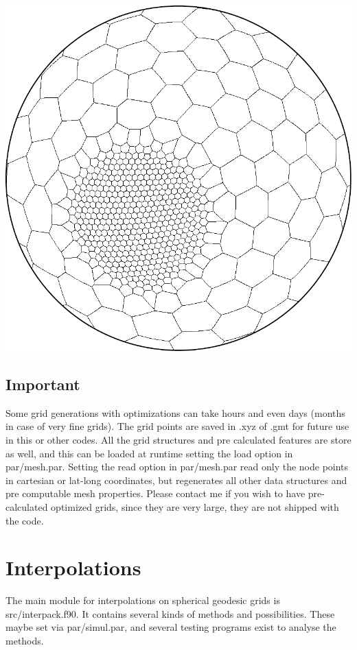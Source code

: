 \documentclass[a4paper,10pt]{article}
\begin{document}
\includegraphics[scale=0.5]{icos_ref_scvt_h1_3}

\subsection{Important}

Some grid generations with optimizations can take hours and even days (months in case of very fine grids). The grid points are saved in .xyz of .gmt for future use in this or other codes. All the grid structures and pre calculated features are store as well, and this can be loaded at runtime setting the load option in par/mesh.par. Setting the read option in par/mesh.par read only the node points in cartesian or lat-long coordinates, but regenerates all other data structures and pre computable mesh properties. Please contact me if you wish to have pre-calculated optimized grids, since they are very large, they are not shipped with the code.


\section{Interpolations}

The main module for interpolations on spherical geodesic grids is src/interpack.f90. It contains several kinds of methods and possibilities. These maybe set via par/simul.par, and several testing programs exist to analyse the methods.
\end{document}
